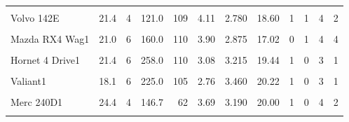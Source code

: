 \documentclass[
  10pt,
]{scrartcl}
\begin{document}
\begin{longtable}[t]{lrrrrrrrrrrr}
\cellcolor{gray!10}{Maserati Bora} & \cellcolor{gray!10}{15.0} & \cellcolor{gray!10}{8} & \cellcolor{gray!10}{301.0} & \cellcolor{gray!10}{335} & \cellcolor{gray!10}{3.54} & \cellcolor{gray!10}{3.570} & \cellcolor{gray!10}{14.60} & \cellcolor{gray!10}{0} & \cellcolor{gray!10}{1} & \cellcolor{gray!10}{5} & \cellcolor{gray!10}{8}\\
Volvo 142E & 21.4 & 4 & 121.0 & 109 & 4.11 & 2.780 & 18.60 & 1 & 1 & 4 & 2\\
\cellcolor{gray!10}{Mazda RX41} & \cellcolor{gray!10}{21.0} & \cellcolor{gray!10}{6} & \cellcolor{gray!10}{160.0} & \cellcolor{gray!10}{110} & \cellcolor{gray!10}{3.90} & \cellcolor{gray!10}{2.620} & \cellcolor{gray!10}{16.46} & \cellcolor{gray!10}{0} & \cellcolor{gray!10}{1} & \cellcolor{gray!10}{4} & \cellcolor{gray!10}{4}\\
Mazda RX4 Wag1 & 21.0 & 6 & 160.0 & 110 & 3.90 & 2.875 & 17.02 & 0 & 1 & 4 & 4\\
\cellcolor{gray!10}{Datsun 7101} & \cellcolor{gray!10}{22.8} & \cellcolor{gray!10}{4} & \cellcolor{gray!10}{108.0} & \cellcolor{gray!10}{93} & \cellcolor{gray!10}{3.85} & \cellcolor{gray!10}{2.320} & \cellcolor{gray!10}{18.61} & \cellcolor{gray!10}{1} & \cellcolor{gray!10}{1} & \cellcolor{gray!10}{4} & \cellcolor{gray!10}{1}\\
\addlinespace
Hornet 4 Drive1 & 21.4 & 6 & 258.0 & 110 & 3.08 & 3.215 & 19.44 & 1 & 0 & 3 & 1\\
\cellcolor{gray!10}{Hornet Sportabout1} & \cellcolor{gray!10}{18.7} & \cellcolor{gray!10}{8} & \cellcolor{gray!10}{360.0} & \cellcolor{gray!10}{175} & \cellcolor{gray!10}{3.15} & \cellcolor{gray!10}{3.440} & \cellcolor{gray!10}{17.02} & \cellcolor{gray!10}{0} & \cellcolor{gray!10}{0} & \cellcolor{gray!10}{3} & \cellcolor{gray!10}{2}\\
Valiant1 & 18.1 & 6 & 225.0 & 105 & 2.76 & 3.460 & 20.22 & 1 & 0 & 3 & 1\\
\cellcolor{gray!10}{Duster 3601} & \cellcolor{gray!10}{14.3} & \cellcolor{gray!10}{8} & \cellcolor{gray!10}{360.0} & \cellcolor{gray!10}{245} & \cellcolor{gray!10}{3.21} & \cellcolor{gray!10}{3.570} & \cellcolor{gray!10}{15.84} & \cellcolor{gray!10}{0} & \cellcolor{gray!10}{0} & \cellcolor{gray!10}{3} & \cellcolor{gray!10}{4}\\
Merc 240D1 & 24.4 & 4 & 146.7 & 62 & 3.69 & 3.190 & 20.00 & 1 & 0 & 4 & 2\\
\addlinespace
\cellcolor{gray!10}{Merc 2301} & \cellcolor{gray!10}{22.8} & \cellcolor{gray!10}{4} & \cellcolor{gray!10}{140.8} & \cellcolor{gray!10}{95} & \cellcolor{gray!10}{3.92} & \cellcolor{gray!10}{3.150} & \cellcolor{gray!10}{22.90} & \cellcolor{gray!10}{1} & \cellcolor{gray!10}{0} & \cellcolor{gray!10}{4} & \cellcolor{gray!10}{2}\\

\end{longtable}
\end{document}
